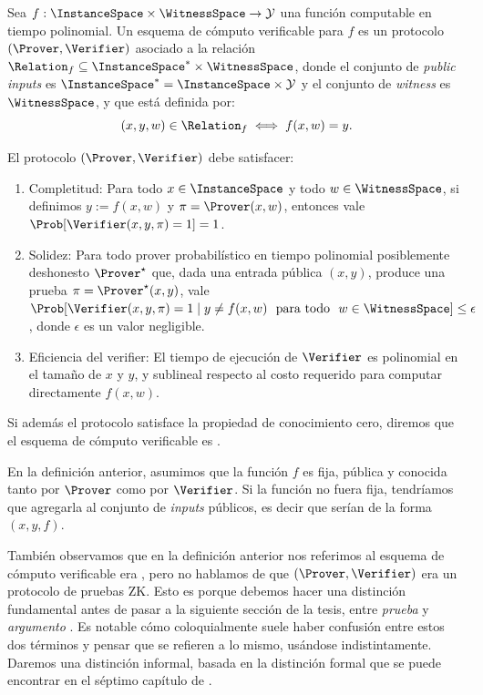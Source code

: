 \begin{definition}
	Sea $f: \InstanceSpace \times \WitnessSpace \to \mathcal{Y}$ una función computable en tiempo polinomial. Un esquema de cómputo verificable para $f$ es un protocolo $(\Prover, \Verifier)$ asociado a la relación $\Relation_f \subseteq \InstanceSpace^* \times \WitnessSpace$, donde el conjunto de \textit{public inputs} es $\InstanceSpace^* = \InstanceSpace \times \mathcal{Y}$ y el conjunto de \textit{witness} es $\WitnessSpace$, y que está definida por:
	$$(x, y, w) \in \Relation_f \iff f(x,w) = y.$$
	
	El protocolo $(\Prover, \Verifier)$ debe satisfacer:
	\begin{enumerate}[noitemsep]
		\item Completitud: Para todo $x \in \InstanceSpace$ y todo $w \in \WitnessSpace$, si definimos $y := f(x,w)$ y $\pi = \Prover(x,w)$, entonces vale $\Prob[\Verifier(x,y, \pi) = 1] = 1$.
		\item Solidez: Para todo prover probabilístico en tiempo polinomial posiblemente deshonesto $\Prover^\star$ que, dada una entrada pública $(x,y)$, produce una prueba $\pi = \Prover^\star(x,y)$, vale $\Prob[\Verifier(x, y, \pi) = 1 \mid y \neq f(x,w)\ \textnormal{ para todo }\ w \in \WitnessSpace] \leq \epsilon$, donde $\epsilon$ es un valor negligible.
		\item Eficiencia del verifier: El tiempo de ejecución de $\Verifier$ es polinomial en el tamaño de $x$ y $y$, y sublineal respecto al costo requerido para computar directamente $f(x,w)$.
	\end{enumerate}
	
	Si además el protocolo satisface la propiedad de conocimiento cero, diremos que el esquema de cómputo verificable es \ZK.
\end{definition}

En la definición anterior, asumimos que la función $f$ es fija, pública y conocida tanto por $\Prover$ como por $\Verifier$. Si la función no fuera fija, tendríamos que agregarla al conjunto de \textit{inputs} públicos, es decir que serían de la forma $(x, y, f)$.

También observamos que en la definición anterior nos referimos al esquema de cómputo verificable era \ZK, pero no hablamos de que $(\Prover, \Verifier)$ era un protocolo de pruebas ZK. Esto es porque debemos hacer una distinción fundamental antes de pasar a la siguiente sección de la tesis, entre \textit{prueba \ZK} y \textit{argumento \ZK}. Es notable cómo coloquialmente suele haber confusión entre estos dos términos y pensar que se refieren a lo mismo, usándose indistintamente. Daremos una distinción informal, basada en la distinción formal que se puede encontrar en el séptimo capítulo de \cite{Goldreich2001}.

